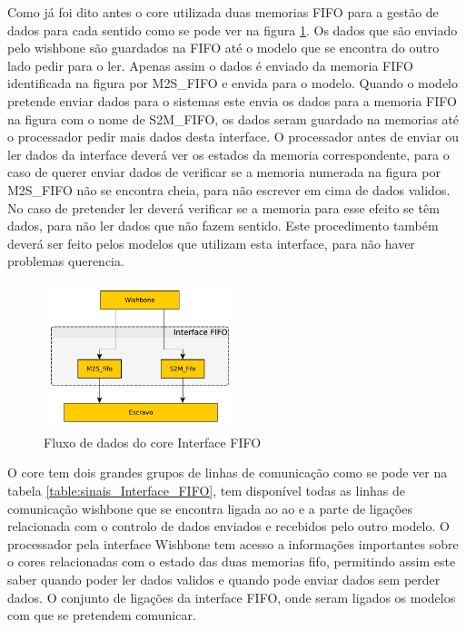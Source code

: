 Como já foi dito antes o core utilizada duas memorias FIFO para a gestão de dados para cada sentido como se pode ver na figura \ref{fig:fluxo_Interface FIFO}. Os dados que são enviado pelo wishbone são guardados na FIFO até o modelo que se encontra do outro lado pedir para o ler. Apenas assim o dados é enviado da memoria FIFO identificada na figura por M2S\_FIFO e envida para o modelo. Quando o modelo pretende enviar dados para o sistemas este envia os dados para a memoria FIFO na figura com o nome de S2M\_FIFO, os dados seram guardado na memorias até o processador pedir mais dados desta interface. O processador antes de enviar ou ler dados da interface deverá ver os estados da memoria correspondente, para o caso de querer enviar dados de verificar se a memoria numerada na figura por M2S\_FIFO não se encontra cheia, para não escrever em cima de dados validos. No caso de pretender ler deverá verificar se a memoria para esse efeito se têm dados, para não ler dados que não fazem sentido. Este procedimento também deverá ser feito pelos modelos que utilizam esta interface, para não haver problemas querencia. 

\begin{figure}[!htb]
  \centering
  \includegraphics[width=0.50\textwidth]{grafos/diagrama_Interface_FIFO.pdf} %
  \caption[Fluxo de dados do core Interface FIFO]{Fluxo de dados do core Interface FIFO}  
  \label{fig:fluxo_Interface FIFO}
\end{figure}


O core tem dois grandes grupos de linhas de comunicação como se pode ver na tabela \ref{table:sinais_Interface_FIFO}, tem disponível todas as linhas de comunicação wishbone que se encontra ligada ao ao  e a parte de ligações relacionada com o controlo de dados enviados e recebidos pelo outro modelo. O processador pela interface Wishbone tem acesso a informações importantes sobre o cores relacionadas com o estado das duas memorias fifo, permitindo assim este saber quando poder ler dados validos e quando pode enviar dados sem perder dados. O conjunto de ligações da interface FIFO, onde seram ligados os modelos com que se pretendem comunicar.


